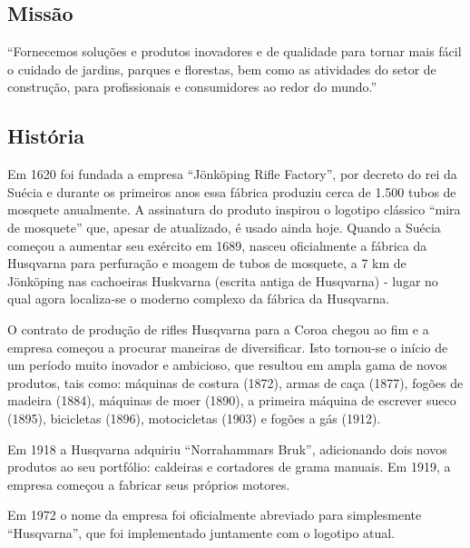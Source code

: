 \documentclass[12pt]{article}
\begin{document}
\subsection{Missão}
	``Fornecemos soluções e produtos inovadores e de qualidade para tornar mais fácil o cuidado de jardins, parques e florestas, bem como as atividades do setor de construção, para profissionais e consumidores ao redor do mundo.''

	
\subsection{História}
	Em 1620 foi fundada a empresa “Jönköping Rifle Factory”, por decreto do rei da Suécia e durante os primeiros anos essa fábrica produziu cerca de 1.500 tubos de mosquete anualmente. A assinatura do produto inspirou o logotipo clássico “mira de mosquete” que, apesar de atualizado, é usado ainda hoje.
	Quando a Suécia começou a aumentar seu exército em 1689, nasceu oficialmente a fábrica da Husqvarna para perfuração e moagem de tubos de mosquete, a 7 km de Jönköping nas cachoeiras Huskvarna (escrita antiga de Husqvarna) - lugar no qual agora localiza-se o moderno complexo da fábrica da Husqvarna.

	O contrato de produção de rifles Husqvarna para a Coroa chegou ao fim e a empresa começou a procurar maneiras de diversificar. Isto tornou-se o início de um período muito inovador e ambicioso, que resultou em ampla gama de novos produtos, tais como: máquinas de costura (1872), armas de caça (1877), fogões de madeira (1884), máquinas de moer (1890), a primeira máquina de escrever sueco (1895), bicicletas (1896), motocicletas (1903) e fogões a gás (1912).

	Em 1918 a Husqvarna adquiriu “Norrahammars Bruk”, adicionando dois novos produtos ao seu portfólio: caldeiras e cortadores de grama manuais. Em 1919, a empresa começou a fabricar seus próprios motores.

	Em 1972 o nome da empresa foi oficialmente abreviado para simplesmente “Husqvarna”, que foi implementado juntamente com o logotipo atual.

\end{document}
